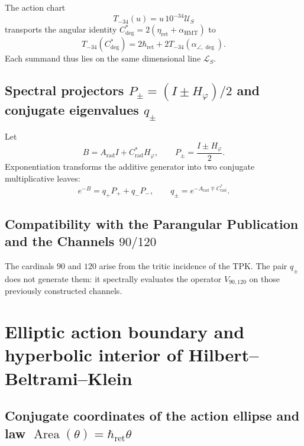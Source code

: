 The action chart
\begin{equation}
 T_{-34}(u)=u\,10^{-34}\mathcal U_S
 \label{eq:l9s102:euler-t34}
\end{equation}
transports the angular identity
\(C^*_{\deg}=2(\eta_{\mathrm{ret}}+\alpha_{\mathrm{HMT}})\) to
\begin{equation}
 \boxed{
 T_{-34}(C^*_{\deg})
 =2\hbar_{\mathrm{ret}}
 +2T_{-34}(\alpha_{\angle,\deg}).}
 \label{eq:l9s102:euler-cstar-hbar}
\end{equation}
Each summand thus lies on the same dimensional line
\(\mathcal L_S\).

\subsection{Spectral projectors \texorpdfstring{\(P_\pm=(I\pm H_\varphi)/2\)}{P+/-=(I+/-H_phi)/2} and conjugate eigenvalues \texorpdfstring{\(q_\pm\)}{q+/-}}

Let
\begin{equation}
 B=A_{\mathrm{rad}}I+C^*_{\mathrm{rad}}H_\varphi,
 \qquad
 P_\pm=\frac{I\pm H_\varphi}{2}.
 \label{eq:l9s102:euler-b}
\end{equation}
Exponentiation transforms the additive generator into two conjugate multiplicative leaves:
\begin{equation}
 \boxed{
 e^{-B}=q_+P_++q_-P_-,
 \qquad
 q_\pm=e^{-A_{\mathrm{rad}}\mp C^*_{\mathrm{rad}}}.}
 \label{eq:l9s102:euler-exp-b}
\end{equation}

\subsection{Compatibility with the Parangular Publication and the Channels \texorpdfstring{\(90/120\)}{90/120}}

The cardinals \(90\) and \(120\) arise from the tritic incidence of the TPK.
The pair \(q_\pm\) does not generate them: it spectrally evaluates the operator
\(V_{90,120}\) on those previously constructed channels.

\section{Elliptic action boundary and hyperbolic interior of Hilbert--Beltrami--Klein}
\label{sec:l9s102:euler-elipse-klein}

\subsection{Conjugate coordinates of the action ellipse and law \texorpdfstring{\(\operatorname{Area}(\theta)=\hbar_{\mathrm{ret}}\theta\)}{Area(theta)=hbar_ret theta}}

